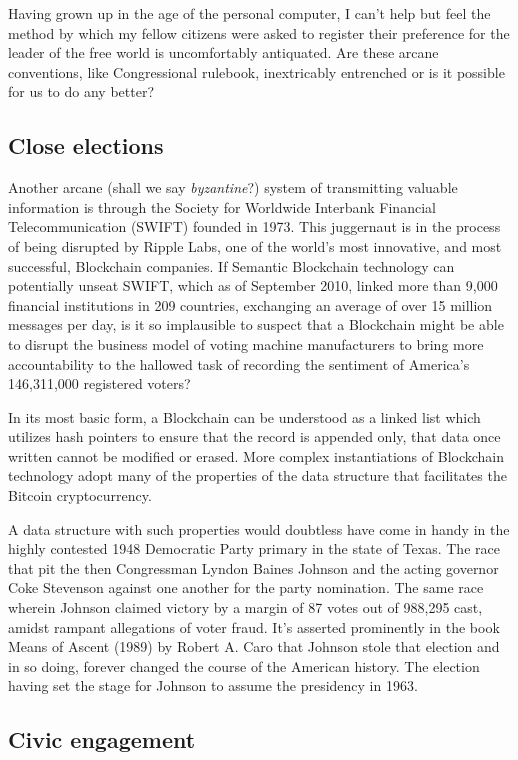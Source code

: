 Having grown up in the age of the personal computer, I can't help but feel the method by which my fellow citizens were asked to register their preference for the leader of the free world is uncomfortably antiquated. Are these arcane conventions, like Congressional rulebook, inextricably entrenched or is it possible for us to do any better?

\subsection*{Close elections}

Another arcane (shall we say \textit{byzantine}?) system of transmitting valuable information is through the Society for Worldwide Interbank Financial Telecommunication (SWIFT) founded in 1973. This juggernaut is in the process of being disrupted by Ripple Labs, one of the world's most innovative, and most successful, Blockchain companies. 
If Semantic Blockchain technology can potentially unseat SWIFT, which as of September 2010, linked more than 9,000 financial institutions in 209 countries, exchanging an average of over 15 million messages per day, is it so implausible to suspect that a Blockchain might be able to disrupt the business model of voting machine manufacturers to bring more accountability to the hallowed task of recording the sentiment of America's 146,311,000 registered voters?

In its most basic form, a Blockchain can be understood as a linked list which utilizes hash pointers to ensure that the record is appended only, that data once written cannot be modified or erased. 
More complex instantiations of Blockchain technology adopt many of the properties of the data structure that facilitates the Bitcoin cryptocurrency.

A data structure with such properties would doubtless have come in handy in the highly contested 1948 Democratic Party primary in the state of Texas. The race that pit the then Congressman Lyndon Baines Johnson and the acting governor Coke Stevenson against one another for the party nomination. The same race wherein Johnson claimed victory by a margin of 87 votes out of 988,295 cast, amidst rampant allegations of voter fraud. It's asserted prominently in the book Means of Ascent (1989) by Robert A. Caro that Johnson stole that election and in so doing, forever changed the course of the American history. The election having set the stage for Johnson to assume the presidency in 1963.

\subsection*{Civic engagement}

